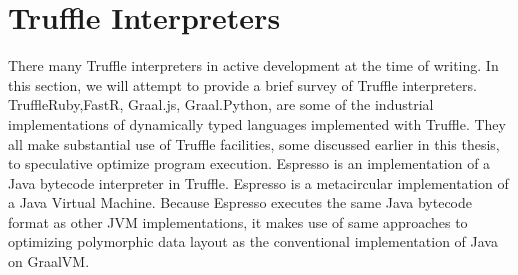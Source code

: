 \section{Truffle Interpreters}

There many Truffle interpreters in active development at the time of writing.
In this section, we will attempt to provide a brief survey of Truffle interpreters.
TruffleRuby\cite{trufflyruby:specialization}\cite{truffleruby:object-model},FastR, Graal.js, Graal.Python,\cite{truffle:thesis} are some of the industrial implementations of dynamically typed languages implemented with Truffle.
They all make substantial use of Truffle facilities, some discussed earlier in this thesis, to speculative optimize program execution. 
Espresso\cite{graalvm:espresso} is an implementation of a Java bytecode interpreter in Truffle. 
Espresso is a metacircular implementation of a Java Virtual Machine.
Because Espresso executes the same Java bytecode format as other JVM implementations, it makes use of same approaches to optimizing polymorphic data layout as the conventional implementation of Java on GraalVM.


